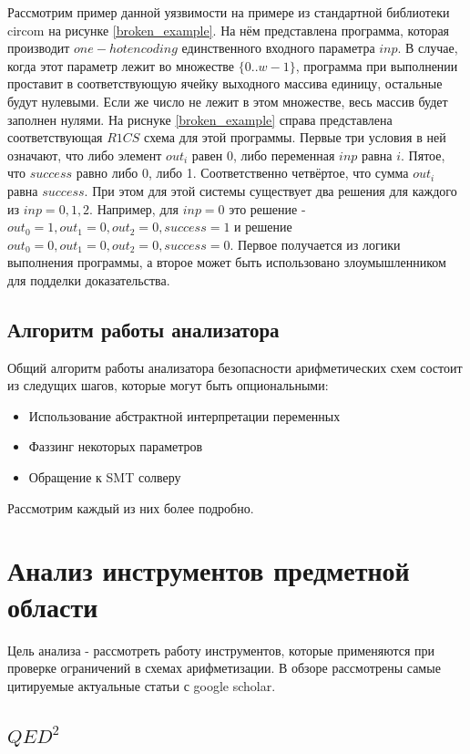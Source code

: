 \documentclass[a4paper]{article}
\begin{document}
Рассмотрим пример данной уязвимости на примере из стандартной библиотеки circom на рисунке \ref{broken_example}. На нём представлена программа, которая производит $one-hot encoding$ единственного входного параметра $inp$. В случае, когда этот параметр лежит во множестве $\{0..w-1\}$, программа при выполнении проставит в соответствующую ячейку выходного массива единицу, остальные будут нулевыми. Если же число не лежит в этом множестве, весь массив будет заполнен нулями. На риснуке \ref{broken_example} справа представлена соответствующая $R1CS$ схема для этой программы. Первые три условия в ней означают, что либо элемент $out_i$ равен 0, либо переменная $inp$ равна $i$. Пятое, что $success$ равно либо 0, либо 1. Соответственно четвёртое, что сумма $out_i$ равна $success$. При этом для этой системы существует два решения для каждого из $inp = 0, 1, 2$. Например, для $inp = 0$ это решение - $out_0 = 1, out_1 = 0, out_2 = 0, success = 1$ и решение $out_0 = 0, out_1 = 0, out_2 = 0, success = 0$. Первое получается из логики выполнения программы, а второе может быть использовано злоумышленником для подделки доказательства.

\subsection{Алгоритм работы анализатора}
Общий алгоритм работы анализатора безопасности арифметических схем состоит из следущих шагов, которые могут быть опциональными:
\begin{itemize}
    \item Использование абстрактной интерпретации переменных
    \item Фаззинг некоторых параметров
    \item Обращение к SMT солверу
\end{itemize}
Рассмотрим каждый из них более подробно.

\newpage
\section{Анализ инструментов предметной области}
\indent

Цель анализа - рассмотреть работу инструментов, которые применяются при проверке ограничений в схемах арифметизации. В обзоре рассмотрены самые цитируемые актуальные статьи с google scholar.

\subsection{$QED^2$}
\indent
\end{document}

